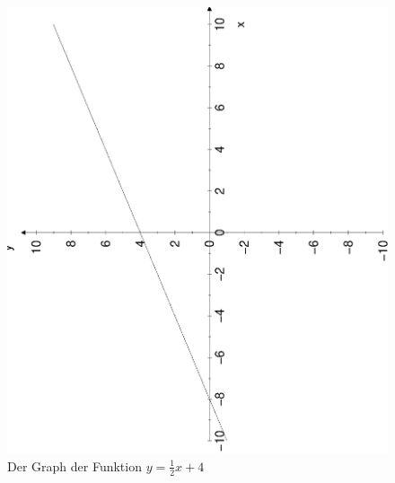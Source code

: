 \documentclass[%
11pt,%
twoside,%
titlepage,%
german,%
headsepline%
]{scrartcl}
\begin{document}
{\begin{figure}[t!]
  \centering
  \includegraphics[angle=-90,width=\linewidth]{pictures/2pktgeg.eps}
  \caption{Der Graph der Funktion $y=\frac{1}{2}x+4$}
  \label{fig:linfkt2:2pktgeg}
\end{figure}




{\settowidth{\labelwidth}{\labelitemi}
\setlength{\leftmargini}{\labelwidth} \addtolength{\leftmargini}{\labelsep}


}}
\end{document}
